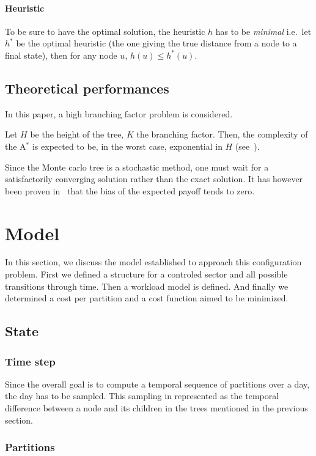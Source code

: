 \documentclass[oneside,twocolumn]{article}
\begin{document}
\paragraph{Heuristic}
To be sure to have the optimal solution, the heuristic \(h\) has to be
\emph{minimal} i.e.\ let \(h^*\) be the optimal heuristic (the one giving the
true distance from a node to a final state), then for any node \(u\), \(h(u)
\leq h^*(u)\).


\subsection{Theoretical performances}
In this paper, a high branching factor problem is considered.

Let \(H\) be the height of the tree, \(K\) the branching factor.
Then, the complexity of the A\(^*\) is expected to be, in the worst case,
exponential in \(H\) (see~\cite{alliotschiex2002ia&it}).

Since the Monte carlo tree is a stochastic method, one must wait for a
satisfactorily converging solution rather than the exact solution. It has
however been proven in~\cite{kocsis2006bandit} that the bias of the expected
payoff tends to zero.


\section{Model}

In this section, we discuss the model established to approach this configuration
problem. First we defined a structure for a controled sector and all possible
transitions through time. Then a workload model is defined. And finally we
determined a cost per partition and a cost function aimed to be minimized.

\subsection{State}

\subsubsection{Time step}
Since the overall goal is to compute a temporal sequence of partitions over a
day, the day has to be sampled. This sampling in represented as the temporal
difference between a node and its children in the trees mentioned in the
previous section.

\subsubsection{Partitions}\label{ssec:partitions}
\end{document}
